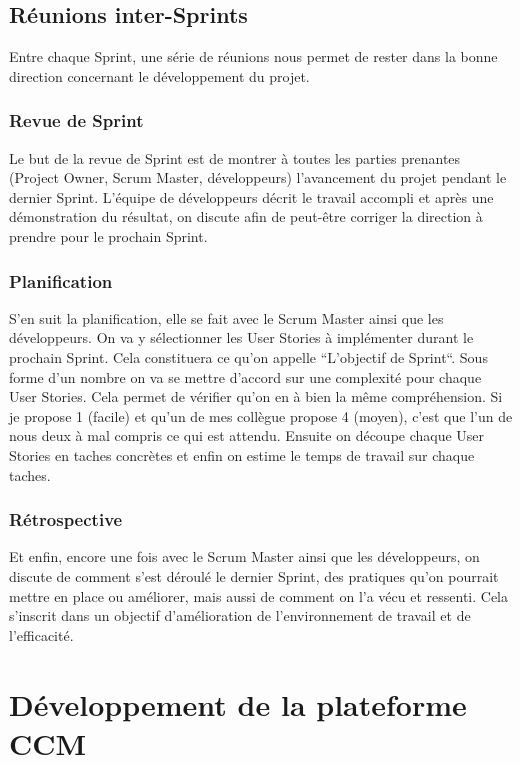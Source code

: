 \documentclass[12pt, a4paper]{report}
\begin{document}
\section{Réunions inter-Sprints}
Entre chaque Sprint, une série de réunions nous permet de rester dans la bonne direction concernant le développement du projet.
\subsection{Revue de Sprint}
Le but de la revue de Sprint est de montrer à toutes les parties prenantes (Project Owner, Scrum Master, développeurs) l'avancement du projet pendant le dernier Sprint.\newline
L'équipe de développeurs décrit le travail accompli et après une démonstration du résultat, on discute afin de peut-être corriger la direction à prendre pour le prochain Sprint.
\subsection{Planification}
S'en suit la planification, elle se fait avec le Scrum Master ainsi que les développeurs.\newline
On va y sélectionner les User Stories à implémenter durant le prochain Sprint. Cela constituera ce qu'on appelle ``L'objectif de Sprint``.\newline
Sous forme d'un nombre on va se mettre d'accord sur une complexité pour chaque User Stories. Cela permet de vérifier qu'on en à bien la même compréhension. Si je propose 1 (facile) et qu'un de mes collègue propose 4 (moyen), c'est que l'un de nous deux à mal compris ce qui est attendu.\newline
Ensuite on découpe chaque User Stories en taches concrètes et enfin on estime le temps de travail sur chaque taches.
\subsection{Rétrospective}
Et enfin, encore une fois avec le Scrum Master ainsi que les développeurs, on discute de comment s'est déroulé le dernier Sprint, des pratiques qu'on pourrait mettre en place ou améliorer, mais aussi de comment on l'a vécu et ressenti.\newline
Cela s'inscrit dans un objectif d'amélioration de l'environnement de travail et de l'efficacité.

\chapter{Développement de la plateforme CCM}
\end{document}
